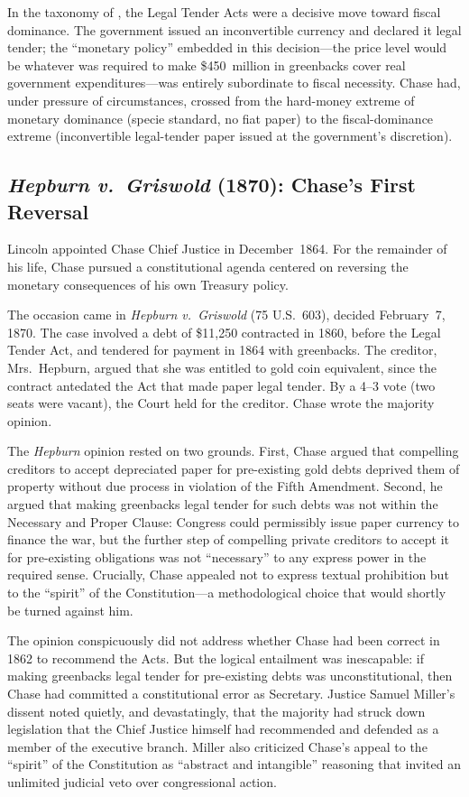 \documentclass[12pt]{article}
\begin{document}
In the taxonomy of \citet{Sargent2011}, the Legal Tender Acts were a
decisive move toward fiscal dominance.  The government issued an
inconvertible currency and declared it legal tender; the ``monetary
policy'' embedded in this decision---the price level would be whatever
was required to make \$450~million in greenbacks cover real government
expenditures---was entirely subordinate to fiscal necessity.  Chase had,
under pressure of circumstances, crossed from the hard-money extreme of
monetary dominance (specie standard, no fiat paper) to the
fiscal-dominance extreme (inconvertible legal-tender paper issued at the
government's discretion).

\subsection{\textit{Hepburn v.\ Griswold} (1870): Chase's First
             Reversal}

Lincoln appointed Chase Chief Justice in December~1864.  For the
remainder of his life, Chase pursued a constitutional agenda centered on
reversing the monetary consequences of his own Treasury policy.

The occasion came in \textit{Hepburn v.\ Griswold} (75 U.S.\ 603),
decided February~7, 1870.  The case involved a debt of \$11,250
contracted in 1860, before the Legal Tender Act, and tendered for
payment in 1864 with greenbacks.  The creditor, Mrs.\ Hepburn, argued
that she was entitled to gold coin equivalent, since the contract
antedated the Act that made paper legal tender.  By a 4--3 vote (two
seats were vacant), the Court held for the creditor.  Chase wrote the
majority opinion.

The \textit{Hepburn} opinion rested on two grounds.  First, Chase argued
that compelling creditors to accept depreciated paper for pre-existing
gold debts deprived them of property without due process in violation
of the Fifth Amendment.  Second, he argued that making greenbacks legal
tender for such debts was not within the Necessary and Proper Clause:
Congress could permissibly issue paper currency to finance the war, but
the further step of compelling private creditors to accept it for
pre-existing obligations was not ``necessary'' to any express power in
the required sense.  Crucially, Chase appealed not to express textual
prohibition but to the ``spirit'' of the Constitution---a methodological
choice that would shortly be turned against him.

The opinion conspicuously did not address whether Chase had been correct
in 1862 to recommend the Acts.  But the logical entailment was
inescapable: if making greenbacks legal tender for pre-existing debts
was unconstitutional, then Chase had committed a constitutional error as
Secretary.  Justice Samuel Miller's dissent noted quietly, and
devastatingly, that the majority had struck down legislation that the
Chief Justice himself had recommended and defended as a member of the
executive branch.  Miller also criticized Chase's appeal to the
``spirit'' of the Constitution as ``abstract and intangible'' reasoning
that invited an unlimited judicial veto over congressional action.
\end{document}
